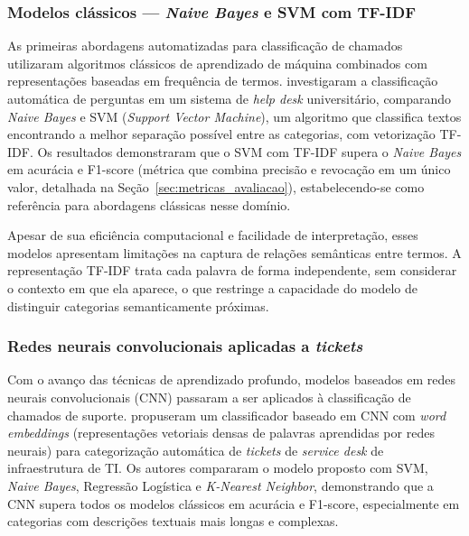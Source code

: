 \documentclass[
    12pt,                %
    openright,           %
    oneside,             %
    a4paper,             %
    english,             %
    brazil               %
]{abntex2}
\begin{document}
\subsubsection{Modelos clássicos — \textit{Naive Bayes} e SVM com TF-IDF}
\label{subsubsec:helpdesk_classicos}

As primeiras abordagens automatizadas para classificação de chamados utilizaram algoritmos clássicos de aprendizado de máquina combinados com representações baseadas em frequência de termos.  investigaram a classificação automática de perguntas em um sistema de \textit{help desk} universitário, comparando \textit{Naive Bayes} e SVM (\textit{Support Vector Machine}), um algoritmo que classifica textos encontrando a melhor separação possível entre as categorias, com vetorização TF-IDF. Os resultados demonstraram que o SVM com TF-IDF supera o \textit{Naive Bayes} em acurácia e F1-score (métrica que combina precisão e revocação em um único valor, detalhada na Seção~\ref{sec:metricas_avaliacao}), estabelecendo-se como referência para abordagens clássicas nesse domínio.

Apesar de sua eficiência computacional e facilidade de interpretação, esses modelos apresentam limitações na captura de relações semânticas entre termos. A representação TF-IDF trata cada palavra de forma independente, sem considerar o contexto em que ela aparece, o que restringe a capacidade do modelo de distinguir categorias semanticamente próximas.

\subsubsection{Redes neurais convolucionais aplicadas a \textit{tickets}}
\label{subsubsec:helpdesk_cnn}

Com o avanço das técnicas de aprendizado profundo, modelos baseados em redes neurais convolucionais (CNN) passaram a ser aplicados à classificação de chamados de suporte.  propuseram um classificador baseado em CNN com \textit{word embeddings} (representações vetoriais densas de palavras aprendidas por redes neurais) para categorização automática de \textit{tickets} de \textit{service desk} de infraestrutura de TI. Os autores compararam o modelo proposto com SVM, \textit{Naive Bayes}, Regressão Logística e \textit{K-Nearest Neighbor}, demonstrando que a CNN supera todos os modelos clássicos em acurácia e F1-score, especialmente em categorias com descrições textuais mais longas e complexas.
\end{document}
